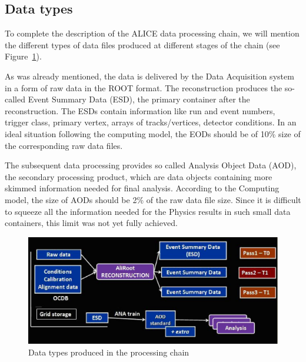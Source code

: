 \documentclass{intech}
\begin{document}
\subsection{Data types}
%
To complete the description of the ALICE data processing chain, we
will mention the different types of data files produced at different
stages of the chain (see Figure~\ref{fig13}).

As was already mentioned, the data is delivered by the Data
Acquisition system in a form of raw data in the ROOT format. The
reconstruction produces the so-called Event Summary Data (ESD), the
primary container after the reconstruction. The ESDs contain
information like run and event numbers, trigger class, primary
vertex, arrays of tracks/vertices, detector conditions. In an ideal
situation following the computing model, the EODs should be of 10\%
size of the corresponding raw data files.

The subsequent data processing provides so called Analysis Object
Data (AOD), the secondary processing product, which are data objects
containing more skimmed information needed for final analysis.
According to the Computing model, the size of AODs should be 2\% of
the raw data file size. Since it is difficult to squeeze all the
information needed for the Physics results in such small data
containers, this limit was not yet fully achieved.

\begin{figure}[htb] %
\centering
\includegraphics[width=13cm]{fig13.eps} %
\caption{Data types produced in the processing chain}\label{fig13}
\end{figure}
\end{document}
